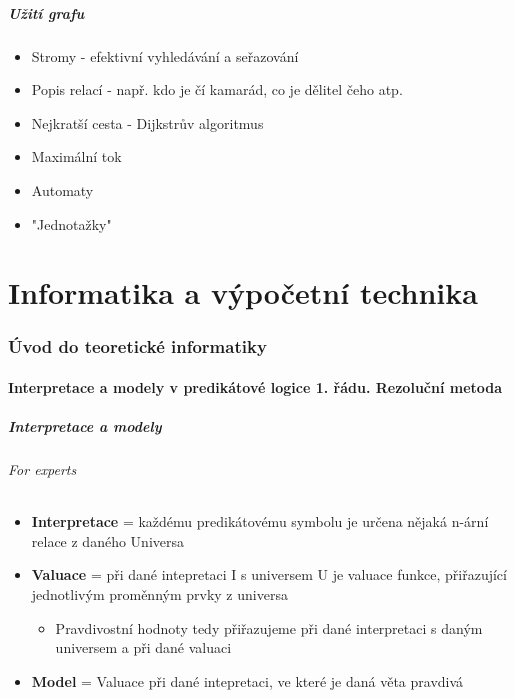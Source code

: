 \documentclass[10pt,a4paper]{article}
\begin{document}
\subsubsection{Užití grafu}
\begin{itemize}
\item Stromy - efektivní vyhledávání a seřazování
\item Popis relací - např. kdo je čí kamarád, co je dělitel čeho atp.
\item Nejkratší cesta - Dijkstrův algoritmus
\item Maximální tok
\item Automaty
\item "Jednotažky"
\end{itemize}
\newpage
\part{Informatika a výpočetní technika}
\newpage
\section{Úvod do teoretické informatiky}
\subsection{Interpretace a modely v predikátové logice 1. řádu. Rezoluční metoda}
\subsubsection{Interpretace a modely}
\paragraph{For experts}
\begin{itemize}
\item \textbf{Interpretace} = každému predikátovému symbolu je určena nějaká n-ární relace z daného Universa
\item \textbf{Valuace} = při dané intepretaci I s universem U je valuace funkce, přiřazující jednotlivým proměnným prvky z universa
\begin{itemize}
\item Pravdivostní hodnoty tedy přiřazujeme při dané interpretaci s daným universem a při dané valuaci
\end{itemize}
\item \textbf{Model} = Valuace při dané intepretaci, ve které je daná věta pravdivá
\end{itemize}
\end{document}
